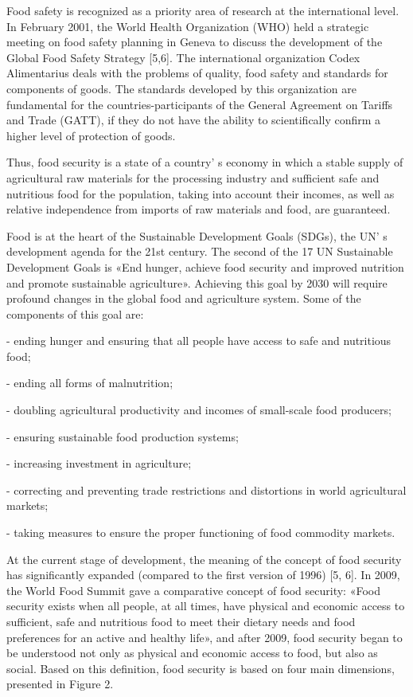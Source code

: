 \begin{multicols}{2}
Food safety is recognized as a priority area of research at the
international level. In February 2001, the World Health Organization
(WHO) held a strategic meeting on food safety planning in Geneva to
discuss the development of the Global Food Safety Strategy {[}5,6{]}.
The international organization Codex Alimentarius deals with the
problems of quality, food safety and standards for components of goods.
The standards developed by this organization are fundamental for the
countries-participants of the General Agreement on Tariffs and Trade
(GATT), if they do not have the ability to scientifically confirm a
higher level of protection of goods.

Thus, food security is a state of a country' s economy in
which a stable supply of agricultural raw materials for the processing
industry and sufficient safe and nutritious food for the population,
taking into account their incomes, as well as relative independence from
imports of raw materials and food, are guaranteed.

Food is at the heart of the Sustainable Development Goals (SDGs), the
UN' s development agenda for the 21st century. The second
of the 17 UN Sustainable Development Goals is «End hunger, achieve food
security and improved nutrition and promote sustainable agriculture».
Achieving this goal by 2030 will require profound changes in the global
food and agriculture system. Some of the components of this goal are:

- ending hunger and ensuring that all people have access to safe and
nutritious food;

- ending all forms of malnutrition;

- doubling agricultural productivity and incomes of small-scale food
producers;

- ensuring sustainable food production systems;

- increasing investment in agriculture;

- correcting and preventing trade restrictions and distortions in world
agricultural markets;

- taking measures to ensure the proper functioning of food commodity
markets.

At the current stage of development, the meaning of the concept of food
security has significantly expanded (compared to the first version of
1996) {[}5, 6{]}. In 2009, the World Food Summit gave a comparative
concept of food security: «Food security exists when all people, at all
times, have physical and economic access to sufficient, safe and
nutritious food to meet their dietary needs and food preferences for an
active and healthy life», and after 2009, food security began to be
understood not only as physical and economic access to food, but also as
social. Based on this definition, food security is based on four main
dimensions, presented in Figure 2.
\end{multicols}

